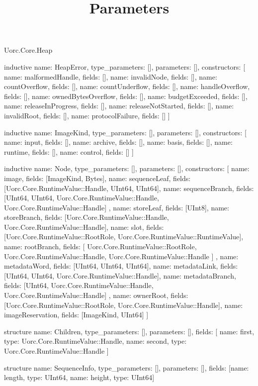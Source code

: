 \begin{lexlean}{Uorc.Core.Heap}
\title{Parameters}
\begin{semanticmodule}
inductive{
  name: HeapError,
  type_parameters: [],
  parameters: [],
  constructors: [
    {name: malformedHandle, fields: []},
    {name: invalidNode, fields: []},
    {name: countOverflow, fields: []},
    {name: countUnderflow, fields: []},
    {name: handleOverflow, fields: []},
    {name: ownedBytesOverflow, fields: []},
    {name: budgetExceeded, fields: []},
    {name: releaseInProgress, fields: []},
    {name: releaseNotStarted, fields: []},
    {name: invalidRoot, fields: []},
    {name: protocolFailure, fields: []}
  ]
}

inductive{
  name: ImageKind,
  type_parameters: [],
  parameters: [],
  constructors: [
    {name: input, fields: []},
    {name: archive, fields: []},
    {name: basis, fields: []},
    {name: runtime, fields: []},
    {name: control, fields: []}
  ]
}

inductive{
  name: Node,
  type_parameters: [],
  parameters: [],
  constructors: [
    {name: image, fields: [ImageKind, Bytes]},
    {name: sequenceLeaf, fields: [Uorc.Core.RuntimeValue::Handle, UInt64, UInt64]},
    {
      name: sequenceBranch,
      fields: [UInt64, UInt64, Uorc.Core.RuntimeValue::Handle, Uorc.Core.RuntimeValue::Handle]
    },
    {name: storeLeaf, fields: [UInt8]},
    {name: storeBranch, fields: [Uorc.Core.RuntimeValue::Handle, Uorc.Core.RuntimeValue::Handle]},
    {name: slot, fields: [Uorc.Core.RuntimeValue::RootRole, Uorc.Core.RuntimeValue::RuntimeValue]},
    {
      name: rootBranch,
      fields: [
        Uorc.Core.RuntimeValue::RootRole,
        Uorc.Core.RuntimeValue::Handle,
        Uorc.Core.RuntimeValue::Handle
      ]
    },
    {name: metadataWord, fields: [UInt64, UInt64, UInt64]},
    {name: metadataLink, fields: [UInt64, UInt64, Uorc.Core.RuntimeValue::Handle]},
    {
      name: metadataBranch,
      fields: [UInt64, Uorc.Core.RuntimeValue::Handle, Uorc.Core.RuntimeValue::Handle]
    },
    {name: ownerRoot, fields: [Uorc.Core.RuntimeValue::RootRole, Uorc.Core.RuntimeValue::Handle]},
    {name: imageReservation, fields: [ImageKind, UInt64]}
  ]
}

structure{
  name: Children,
  type_parameters: [],
  parameters: [],
  fields: [
    {name: first, type: Uorc.Core.RuntimeValue::Handle},
    {name: second, type: Uorc.Core.RuntimeValue::Handle}
  ]
}

structure{
  name: SequenceInfo,
  type_parameters: [],
  parameters: [],
  fields: [{name: length, type: UInt64}, {name: height, type: UInt64}]
}


\end{semanticmodule}
\end{lexlean}
